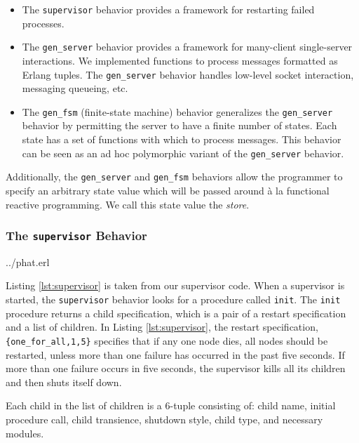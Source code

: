 \documentclass[10pt,letter]{article}
\begin{document}
\begin{itemize}
\item The \texttt{supervisor} behavior provides a framework for restarting
  failed processes.
\item The \texttt{gen\_server} behavior provides a framework for many-client
  single-server interactions. We implemented functions to process messages
  formatted as Erlang tuples. The \texttt{gen\_server} behavior handles
  low-level socket interaction, messaging queueing, etc.
\item The \texttt{gen\_fsm} (finite-state machine) behavior
generalizes the \texttt{gen\_server} behavior by permitting the server
to have a finite number of states. Each state has a set of functions
with which to process messages. This behavior can be seen as an ad hoc
polymorphic variant of the \texttt{gen\_server} behavior.
\end{itemize}

Additionally, the \texttt{gen\_server} and \texttt{gen\_fsm} behaviors allow the
programmer to specify an arbitrary state value which will be passed around \`{a}
la functional reactive programming. We call this state value the \emph{store}.

\subsubsection{The \texttt{supervisor} Behavior}


                {../phat.erl}

Listing \ref{lst:supervisor} is taken from our supervisor code. When a
supervisor is started, the \texttt{supervisor} behavior looks for a procedure
called \lstinline!init!. The \lstinline!init! procedure returns a child
specification, which is a pair of a restart specification and a list of
children. In Listing \ref{lst:supervisor}, the restart specification,
\lstinline!{one_for_all,1,5}! specifies that if any one node dies, all nodes
should be restarted, unless more than one failure has occurred in the past five
seconds. If more than one failure occurs in five seconds, the supervisor kills
all its children and then shuts itself down.

Each child in the list of children is a 6-tuple consisting of: child name,
initial procedure call, child transience, shutdown style, child type, and
necessary modules.
\end{document}
